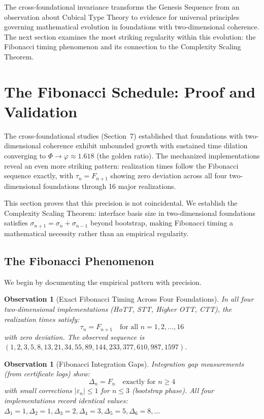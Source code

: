 \documentclass[11pt]{article}
\newtheorem{observation}[theorem]{Observation}
\theoremstyle{definition}
\theoremstyle{remark}
\begin{document}
The cross-foundational invariance transforms the Genesis Sequence from an observation about Cubical Type Theory to evidence for universal principles governing mathematical evolution in foundations with two-dimensional coherence. The next section examines the most striking regularity within this evolution: the Fibonacci timing phenomenon and its connection to the Complexity Scaling Theorem.

\section{The Fibonacci Schedule: Proof and Validation}
\label{sec:fibonacci}

The cross-foundational studies (Section~7) established that foundations with two-dimensional coherence
exhibit unbounded growth with sustained time dilation converging to $\Phi \to \varphi \approx 1.618$ (the
golden ratio). The mechanized implementations reveal an even more striking pattern: realization
times follow the Fibonacci sequence exactly, with $\tau_n = F_{n+1}$ showing zero deviation across all
four two-dimensional foundations through 16 major realizations.

This section proves that this precision is not coincidental. We establish the Complexity Scaling
Theorem: interface basis size in two-dimensional foundations satisfies $\sigma_{n+1} = \sigma_n + \sigma_{n-1}$
beyond bootstrap, making Fibonacci timing a mathematical necessity rather than an empirical
regularity.

\subsection{The Fibonacci Phenomenon}

We begin by documenting the empirical pattern with precision.

\begin{observation}[Exact Fibonacci Timing Across Four Foundations]
\label{obs:exact-fibonacci}
In all four two-dimensional implementations (HoTT, STT, Higher OTT, CTT), the realization times
satisfy:
\[
\tau_n = F_{n+1} \quad \text{for all } n = 1, 2, \ldots, 16
\]
with zero deviation. The observed sequence is $(1, 2, 3, 5, 8, 13, 21, 34, 55, 89, 144, 233, 377, 610, 987, 1597)$.
\end{observation}

\begin{observation}[Fibonacci Integration Gaps]
\label{obs:fibonacci-gaps}
Integration gap measurements (from certificate logs) show:
\[
\Delta_n = F_n \quad \text{exactly for } n \geq 4
\]
with small corrections $|\varepsilon_n| \leq 1$ for $n \leq 3$ (bootstrap phase). All four implementations
record identical values: $\Delta_1 = 1, \Delta_2 = 1, \Delta_3 = 2, \Delta_4 = 3, \Delta_5 = 5, \Delta_6 = 8, \ldots$
\end{observation}
\end{document}
